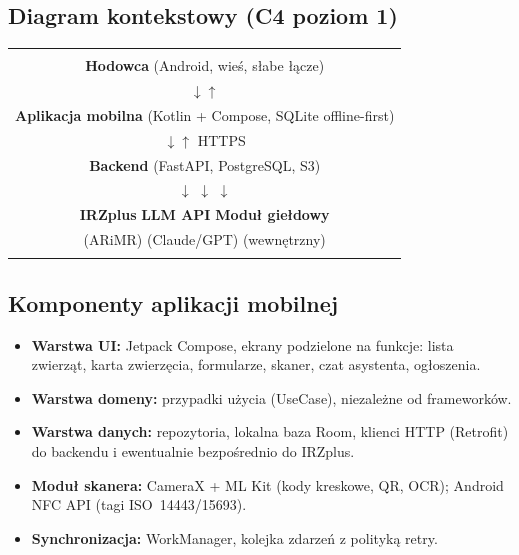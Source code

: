 \documentclass[11pt,a4paper]{article}
\begin{document}
\subsection{Diagram kontekstowy (C4 poziom 1)}

\begin{center}
\begin{tabular}{|c|}
\hline
\\
\textbf{Hodowca} (Android, wieś, słabe łącze) \\
$\downarrow\uparrow$ \\
\textbf{Aplikacja mobilna} (Kotlin + Compose, SQLite offline-first) \\
$\downarrow\uparrow$ HTTPS \\
\textbf{Backend} (FastAPI, PostgreSQL, S3) \\
$\downarrow$ \hfill $\downarrow$ \hfill $\downarrow$ \\
\textbf{IRZplus} \hspace{0.5cm} \textbf{LLM API} \hspace{0.5cm} \textbf{Moduł giełdowy} \\
(ARiMR) \hspace{0.5cm} (Claude/GPT) \hspace{0.5cm} (wewnętrzny) \\
\\
\hline
\end{tabular}
\end{center}

\subsection{Komponenty aplikacji mobilnej}

\begin{itemize}
  \item \textbf{Warstwa UI:} Jetpack Compose, ekrany podzielone na funkcje: lista zwierząt, karta zwierzęcia, formularze, skaner, czat asystenta, ogłoszenia.
  \item \textbf{Warstwa domeny:} przypadki użycia (UseCase), niezależne od frameworków.
  \item \textbf{Warstwa danych:} repozytoria, lokalna baza Room, klienci HTTP (Retrofit) do backendu i ewentualnie bezpośrednio do IRZplus.
  \item \textbf{Moduł skanera:} CameraX + ML Kit (kody kreskowe, QR, OCR); Android NFC API (tagi ISO~14443/15693).
  \item \textbf{Synchronizacja:} WorkManager, kolejka zdarzeń z polityką retry.
\end{itemize}
\end{document}
